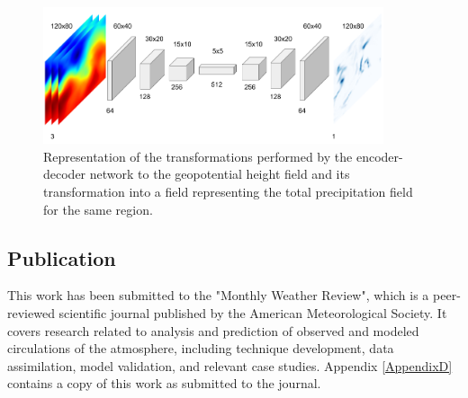 \begin{figure}[h]
 \centerline{\includegraphics[width=10cm]{paper4.png}}\caption{Representation of the transformations performed by the encoder-decoder network to the geopotential height field and its transformation into a field representing the total precipitation field for the same region.}\label{paper4}
\end{figure}

\subsection{Publication}

This work has been submitted to the "Monthly Weather Review", which is a peer-reviewed scientific journal published by the American Meteorological Society. It covers research related to analysis and prediction of observed and modeled circulations of the atmosphere, including technique development, data assimilation, model validation, and relevant case studies. Appendix \ref{AppendixD} contains a copy of this work as submitted to the journal.
